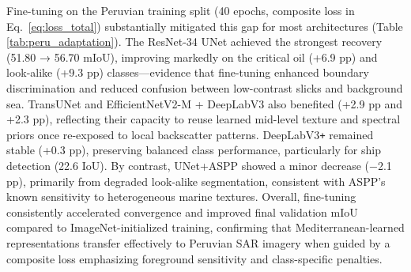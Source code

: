 \documentclass[12pt]{article}
\begin{document}
Fine-tuning on the Peruvian training split (40 epochs, composite loss in Eq.~\ref{eq:loss_total}) substantially mitigated this gap for most architectures (Table \ref{tab:peru_adaptation}). The ResNet-34 UNet achieved the strongest recovery (51.80 → 56.70 mIoU), improving markedly on the critical oil (+6.9 pp) and look-alike (+9.3 pp) classes—evidence that fine-tuning enhanced boundary discrimination and reduced confusion between low-contrast slicks and background sea. TransUNet and EfficientNetV2-M + DeepLabV3 also benefited (+2.9 pp and +2.3 pp), reflecting their capacity to reuse learned mid-level texture and spectral priors once re-exposed to local backscatter patterns. DeepLabV3\texttt{+} remained stable (+0.3 pp), preserving balanced class performance, particularly for ship detection (22.6 IoU). By contrast, UNet+ASPP showed a minor decrease (−2.1 pp), primarily from degraded look-alike segmentation, consistent with ASPP’s known sensitivity to heterogeneous marine textures. Overall, fine-tuning consistently accelerated convergence and improved final validation mIoU compared to ImageNet-initialized training, confirming that Mediterranean-learned representations transfer effectively to Peruvian SAR imagery when guided by a composite loss emphasizing foreground sensitivity and class-specific penalties.
\end{document}
